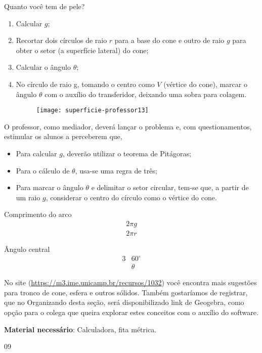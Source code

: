 \begin{sugestions}{Quanto você tem de pele?}
{\begin{enumerate}
\item Calcular $g$;
\item Recortar dois círculos de raio $r$ para a base do cone e outro de raio $g$ para obter o setor (a superfície lateral) do cone;
\item Calcular o ângulo $\theta$;
\item No círculo de raio g, tomando o centro como $V$ (vértice do cone), marcar o ângulo $\theta$ com o auxílio do transferidor, deixando uma sobra para colagem.
\begin{figure}[H]
\centering

\texttt{[image: superficie-professor13]}
\end{figure}
\end{enumerate}

 
O professor, como mediador, deverá lançar o problema e, com questionamentos, estimular os alunos a perceberem que, 

\begin{itemize}
\item  Para calcular $g$, deverão utilizar o teorema de Pitágoras;
\item Para o cálculo de $\theta$, usa-se uma regra de três;
\item Para marcar o ângulo $\theta$ e delimitar o setor circular, tem-se que, a partir de um raio $g$, considerar o centro do círculo como o vértice do cone.
\end{itemize}

\begin{multicols}{2}
\centering
Comprimento do arco
\begin{align*}
2\pi g\\
2\pi r
\end{align*}

\columnbreak
Ângulo central
\begin{align*}
3&60^{\circ}\\
&\theta
\end{align*}
\end{multicols}
No site (\url{https://m3.ime.unicamp.br/recursos/1032}) você encontra mais sugestões para tronco de cone, esfera e outros sólidos. Também gostaríamos de registrar, que no Organizando desta seção, será disponibilizado link de Geogebra, como opção para o colega que queira explorar estes conceitos com o auxílio do software.

\textbf{Material necessário}: Calculadora, fita métrica.
}{0}{9}
\end{sugestions}
